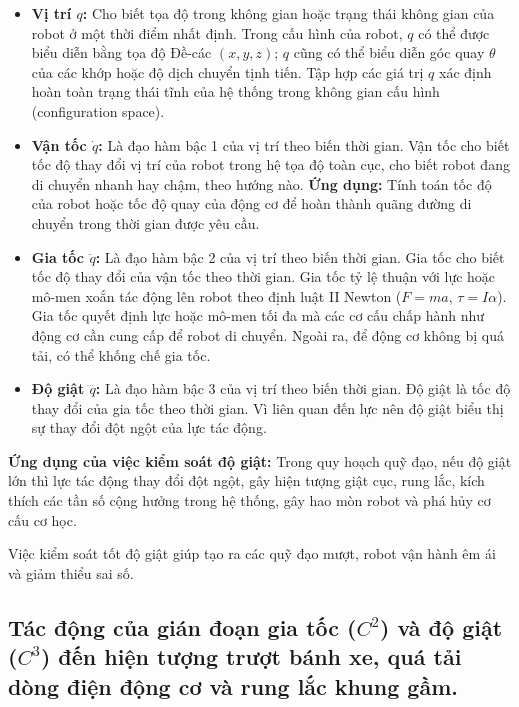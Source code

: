 \documentclass[12pt,a4paper,oneside]{report}
\begin{document}
\begin{itemize}
  \item \textbf{Vị trí \(q\):} Cho biết tọa độ trong không gian hoặc trạng thái không gian của robot ở một thời điểm nhất định. Trong cấu hình của robot, \(q\) có thể được biểu diễn bằng tọa độ Đề-các \((x,y,z)\); \(q\) cũng có thể biểu diễn góc quay \(\theta\) của các khớp hoặc độ dịch chuyển tịnh tiến. Tập hợp các giá trị \(q\) xác định hoàn toàn trạng thái tĩnh của hệ thống trong không gian cấu hình (configuration space).
  \item \textbf{Vận tốc \(\dot{q}\):} Là đạo hàm bậc 1 của vị trí theo biến thời gian. Vận tốc cho biết tốc độ thay đổi vị trí của robot trong hệ tọa độ toàn cục, cho biết robot đang di chuyển nhanh hay chậm, theo hướng nào. \textbf{Ứng dụng:} Tính toán tốc độ của robot hoặc tốc độ quay của động cơ để hoàn thành quãng đường di chuyển trong thời gian được yêu cầu.
  \item \textbf{Gia tốc \(\ddot{q}\):} Là đạo hàm bậc 2 của vị trí theo biến thời gian. Gia tốc cho biết tốc độ thay đổi của vận tốc theo thời gian. Gia tốc tỷ lệ thuận với lực hoặc mô-men xoắn tác động lên robot theo định luật II Newton (\(F=ma\), \(\tau=I\alpha\)). Gia tốc quyết định lực hoặc mô-men tối đa mà các cơ cấu chấp hành như động cơ cần cung cấp để robot di chuyển. Ngoài ra, để động cơ không bị quá tải, có thể khống chế gia tốc.
  \item \textbf{Độ giật \(\dddot{q}\):} Là đạo hàm bậc 3 của vị trí theo biến thời gian. Độ giật là tốc độ thay đổi của gia tốc theo thời gian. Vì liên quan đến lực nên độ giật biểu thị sự thay đổi đột ngột của lực tác động.
\end{itemize}

\textbf{Ứng dụng của việc kiểm soát độ giật:} Trong quy hoạch quỹ đạo, nếu độ giật lớn thì lực tác động thay đổi đột ngột, gây hiện tượng giật cục, rung lắc, kích thích các tần số cộng hưởng trong hệ thống, gây hao mòn robot và phá hủy cơ cấu cơ học.

Việc kiểm soát tốt độ giật giúp tạo ra các quỹ đạo mượt, robot vận hành êm ái và giảm thiểu sai số.

\subsection{\texorpdfstring{Tác động của gián đoạn gia tốc (\(C^{2}\)) và độ giật (\(C^{3}\)) đến hiện tượng trượt bánh xe, quá tải dòng điện động cơ và rung lắc khung gầm.}{Tác động của gián đoạn gia tốc (C2) và độ giật (C3) đến hiện tượng trượt bánh xe, quá tải dòng điện động cơ và rung lắc khung gầm.}}
\end{document}
